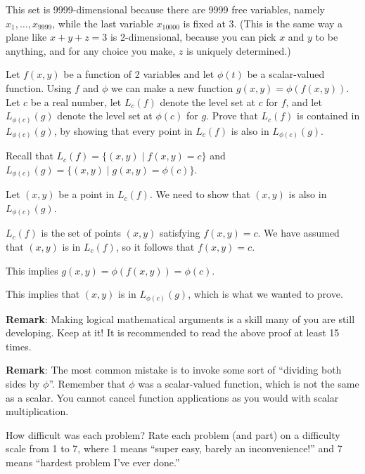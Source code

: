 \begin{problem}
\begin{enumerate}[(a)]
\begin{solution}
      This set is 9999-dimensional because there are 9999 free variables, namely $x_1,\dots,x_{9999}$, while the last variable $x_{10000}$ is fixed at 3. (This is the same way a plane like $x+y+z=3$ is 2-dimensional, because you can pick $x$ and $y$ to be anything, and for any choice you make, $z$ is uniquely determined.)
    \end{solution}
  \end{enumerate}
\end{problem}

\begin{problem}
  Let $f(x,y)$ be a function of 2 variables and let $\phi(t)$ be a scalar-valued function. Using $f$ and $\phi$ we can make a new function $g(x,y)=\phi(f(x,y))$. Let $c$ be a real number, let $L_c(f)$ denote the level set at $c$ for $f$, and let $L_{\phi(c)}(g)$ denote the level set at $\phi(c)$ for $g$. Prove that $L_c(f)$ is contained in $L_{\phi(c)}(g)$, by showing that every point in $L_c(f)$ is also in $L_{\phi(c)}(g)$.
\end{problem}
\begin{solution}
  Recall that $L_c(f)=\{(x,y)\mid f(x,y)=c\}$ and $L_{\phi(c)}(g)=\{(x,y)\mid g(x,y)=\phi(c)\}$.

  Let $(x,y)$ be a point in $L_c(f)$. We need to show that $(x,y)$ is also in $L_{\phi(c)}(g)$.

  $L_c(f)$ is the set of points $(x,y)$ satisfying $f(x,y)=c$. We have assumed that $(x,y)$ is in $L_c(f)$, so it follows that $f(x,y)=c$.

  This implies $g(x,y)=\phi(f(x,y))=\phi(c)$.

  This implies that $(x,y)$ is in $L_{\phi(c)}(g)$, which is what we wanted to prove.

  \textbf{Remark}: Making logical mathematical arguments is a skill many of you are still developing. Keep at it! It is recommended to read the above proof at least 15 times.

  \textbf{Remark}: The most common mistake is to invoke some sort of ``dividing both sides by $\phi$''. Remember that $\phi$ was a scalar-valued function, which is not the same as a scalar. You cannot cancel function applications as you would with scalar multiplication.
\end{solution}

\begin{problem}
  How difficult was each problem? Rate each problem (and part) on a difficulty scale from 1 to 7, where 1 means ``super easy, barely an inconvenience!'' and 7 means ``hardest problem I've ever done.''
\end{problem}

